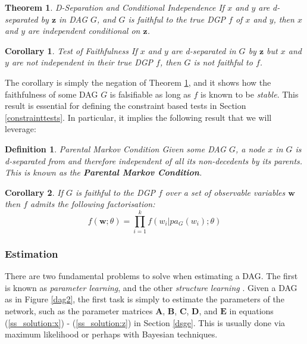 \documentclass{article}
\newtheorem{definition}{Definition}
\newtheorem{corollary}{Corollary}
\newtheorem{theorem}{Theorem}
\begin{document}
\theoremstyle{theorem}
\begin{theorem}{D-Separation and Conditional Independence}
  If $x$ and $y$ are d-separated by $\mathbf{z}$ in DAG $G$, and $G$ is faithful to the true DGP $f$ of $x$ and $y$, then $x$ and $y$ are independent conditional on $\mathbf{z}$. 
  \parencite[p.16]{pearl2009causality}
  \label{dseptheorem}
\end{theorem}
\theoremstyle{corollary}
\begin{corollary}{Test of Faithfulness}
  If $x$ and $y$ are d-separated in $G$ by $\mathbf{z}$ but $x$ and $y$ are not independent in their true DGP $f$, then $G$ is not faithful to $f$.
  \label{faithful_corollary}
\end{corollary}

The corollary is simply the negation of Theorem \ref{dseptheorem}, and it shows how the faithfulness of some DAG $G$ is falsifiable as long as $f$ is known to be \textit{stable}. This result is essential for defining the constraint based tests in Section \ref{constrainttests}. In particular, it implies the following result that we will leverage:

\theoremstyle{corollary}
\begin{definition}{Parental Markov Condition}
  Given some DAG $G$, a node $x$ in $G$ is d-separated from and therefore independent of all its non-decedents by its parents. This is known as the \textbf{Parental Markov Condition}. 
  \parencite[p.16, p.19]{pearl2009causality}
  \label{markovcompatibility}
\end{definition}

\theoremstyle{corollary}
\begin{corollary}
  If $G$ is faithful to the DGP $f$ over a set of observable variables $\mathbf{w}$ then $f$ admits the following factorisation:
  \begin{equation}
    f(\mathbf{w};\theta) = \prod_{i=1}^{k} f(w_i | pa_G(w_i);\theta)
  \end{equation}
\end{corollary}

\subsubsection{Estimation} \label{dag_estimation}

There are two fundamental problems to solve when estimating a DAG. The first is known as \textit{parameter learning}, and the other \textit{structure learning} \parencite{ermon_2017}. Given a DAG as in Figure \ref{dag2}, the first task is simply to estimate the parameters of the network, such as the parameter matrices $\mathbf{A}$, $\mathbf{B}$, $\mathbf{C}$, $\mathbf{D}$, and $\mathbf{E}$ in equations (\ref{ss_solution:x}) - (\ref{ss_solution:z}) in Section \ref{dsge}. This is usually done via maximum likelihood or perhaps with Bayesian techniques.
\end{document}
